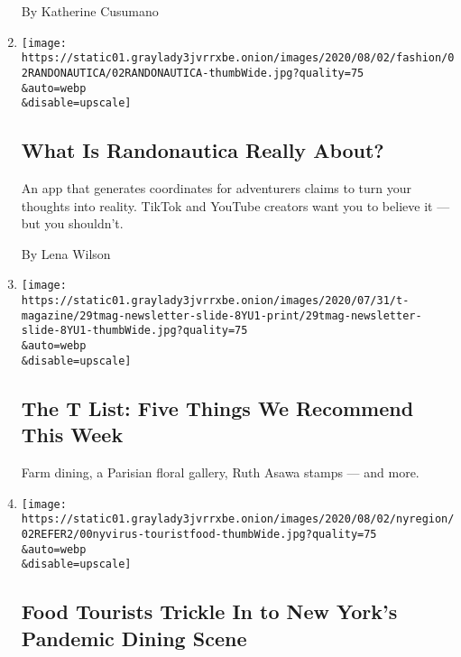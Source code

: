 \begin{enumerate}
  By Katherine Cusumano
\item
  \href{/2020/07/31/style/randonautica-app.html}{}

  \texttt{[image: https://static01.graylady3jvrrxbe.onion/images/2020/08/02/fashion/02RANDONAUTICA/02RANDONAUTICA-thumbWide.jpg?quality=75\\\&auto=webp\\\&disable=upscale]}

  \hypertarget{what-is-randonautica-really-about}{%
  \subsection{What Is Randonautica Really
  About?}\label{what-is-randonautica-really-about}}

  An app that generates coordinates for adventurers claims to turn your
  thoughts into reality. TikTok and YouTube creators want you to believe
  it --- but you shouldn't.

  By Lena Wilson
\item
  \href{/2020/07/30/t-magazine/the-t-list-five-things-we-recommend-this-week.html}{}

  \texttt{[image: https://static01.graylady3jvrrxbe.onion/images/2020/07/31/t-magazine/29tmag-newsletter-slide-8YU1-print/29tmag-newsletter-slide-8YU1-thumbWide.jpg?quality=75\\\&auto=webp\\\&disable=upscale]}

  \hypertarget{the-t-list-five-things-we-recommend-this-week}{%
  \subsection{The T List: Five Things We Recommend This
  Week}\label{the-t-list-five-things-we-recommend-this-week}}

  Farm dining, a Parisian floral gallery, Ruth Asawa stamps --- and
  more.
\item
  \href{/2020/07/30/nyregion/coronavirus-nyc-tourism-restaurants.html}{}

  \texttt{[image: https://static01.graylady3jvrrxbe.onion/images/2020/08/02/nyregion/02REFER2/00nyvirus-touristfood-thumbWide.jpg?quality=75\\\&auto=webp\\\&disable=upscale]}

  \hypertarget{food-tourists-trickle-in-to-new-yorks-pandemic-dining-scene}{%
  \subsection{Food Tourists Trickle In to New York's Pandemic Dining
  Scene}\label{food-tourists-trickle-in-to-new-yorks-pandemic-dining-scene}}


\end{enumerate}
